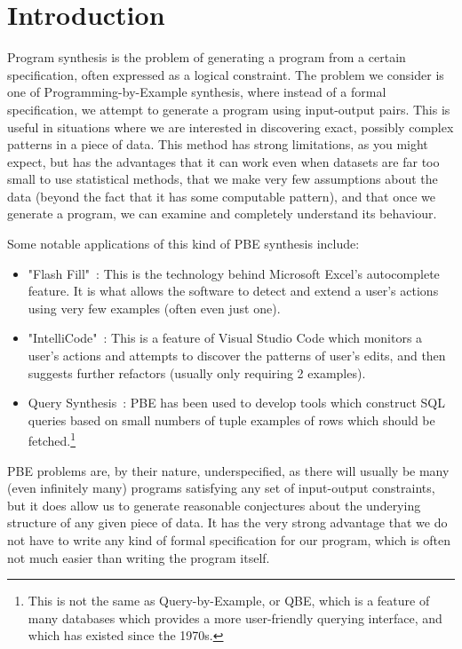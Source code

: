 \section{Introduction}

Program synthesis is the problem of generating a program from a certain specification, often expressed as a logical constraint. The problem we consider is one of Programming-by-Example synthesis, where instead of a formal specification, we attempt to generate a program using input-output pairs. This is useful in situations where we are interested in discovering exact, possibly complex patterns in a piece of data. This method has strong limitations, as you might expect, but has the advantages that it can work even when datasets are far too small to use statistical methods, that we make very few assumptions about the data (beyond the fact that it has some computable pattern), and that once we generate a program, we can examine and completely understand its behaviour.

Some notable applications of this kind of PBE synthesis include:

\begin{itemize}
  \item "Flash Fill"~\cite{gulwani2017program}: This is the technology behind Microsoft Excel's autocomplete feature. It is what allows the software to detect and extend a user's actions using very few examples (often even just one).
  \item "IntelliCode"~\cite{IntelliCode}: This is a feature of Visual Studio Code which monitors a user's actions and attempts to discover the patterns of user's edits, and then suggests further refactors (usually only requiring 2 examples).
  \item Query Synthesis~\cite{Shen2014DiscoveringQB}: PBE has been used to develop tools which construct SQL queries based on small numbers of tuple examples of rows which should be fetched.\footnote{This is not the same as Query-by-Example, or QBE, which is a feature of many databases which provides a more user-friendly querying interface, and which has existed since the 1970s.}
\end{itemize}

PBE problems are, by their nature, underspecified, as there will usually be many (even infinitely many) programs satisfying any set of input-output constraints, but it does allow us to generate reasonable conjectures about the underying structure of any given piece of data. It has the very strong advantage that we do not have to write any kind of formal specification for our program, which is often not much easier than writing the program itself.


